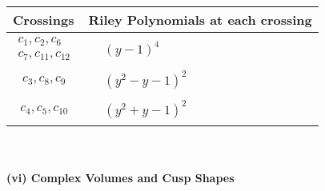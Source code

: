\documentclass[1p]{elsarticle_modified}
\theoremstyle{definition}
\begin{document}
\begin{tabular}{m{50pt}|m{274pt}}
Crossings & \hspace{64pt}Riley Polynomials at each crossing \\
\hline $$\begin{aligned}c_{1},c_{2},c_{6}\\c_{7},c_{11},c_{12}\end{aligned}$$&$\begin{aligned}
&(y-1)^4
\end{aligned}$\\
\hline $$\begin{aligned}c_{3},c_{8},c_{9}\end{aligned}$$&$\begin{aligned}
&(y^2- y-1)^2
\end{aligned}$\\
\hline $$\begin{aligned}c_{4},c_{5},c_{10}\end{aligned}$$&$\begin{aligned}
&(y^2+y-1)^2
\end{aligned}$\\
\hline
\end{tabular}\\~\\
\newpage\flushleft \textbf{(vi) Complex Volumes and Cusp Shapes}
\end{document}
